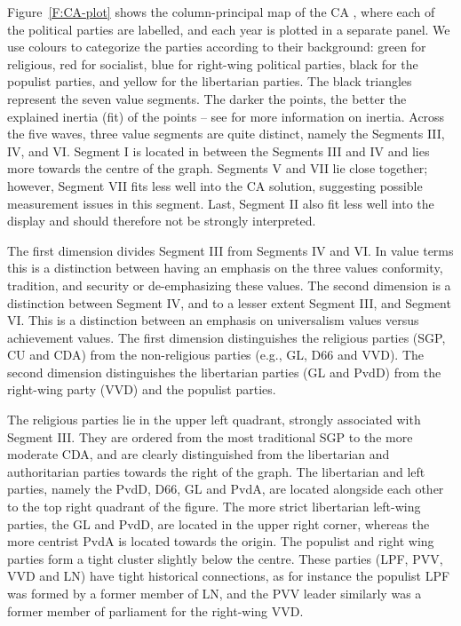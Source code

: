 \documentclass[12pt,letter]{article}\usepackage[]{graphicx}\usepackage[]{xcolor}
\begin{document}
Figure~\ref{F:CA-plot} shows the column-principal map of the CA \citep{greenacre2007}, where each of the political parties are labelled, and each year is plotted in a separate panel. We use colours to categorize the parties according to their background: green for religious, red for socialist, blue for right-wing political parties, black for the populist parties, and yellow for the libertarian parties. The black triangles represent the seven value segments. The darker the points, the better the explained inertia (fit) of the points -- see \citet{greenacre2007} for more information on inertia. Across the five waves, three value segments are quite distinct, namely the Segments III, IV, and VI. Segment I is located in between the Segments III and IV and lies more towards the centre of the graph. Segments V and VII lie close together; however, Segment VII fits less well into the CA solution, suggesting possible measurement issues in this segment. Last, Segment II also fit less well into the display and should therefore not be strongly interpreted.

The first dimension divides Segment III from Segments IV and VI. In value terms this is a distinction between having an emphasis on the three values conformity, tradition, and security or de-emphasizing these values. The second dimension is a distinction between Segment IV, and to a lesser extent Segment III, and Segment VI. This is a distinction between an emphasis on universalism values versus achievement values. The first dimension distinguishes the religious parties (SGP, CU and CDA) from the non-religious parties (e.g., GL, D66 and VVD). The second dimension distinguishes the libertarian parties (GL and PvdD) from the right-wing party (VVD) and the populist parties.

The religious parties lie in the upper left quadrant, strongly associated with Segment III. They are ordered from the most traditional SGP to the more moderate CDA, and are clearly distinguished from the libertarian and authoritarian parties towards the right of the graph. The libertarian and left parties, namely the PvdD, D66, GL and PvdA, are located alongside each other to the top right quadrant of the figure. The more strict libertarian left-wing parties, the GL and PvdD, are located in the upper right corner, whereas the more centrist PvdA is located towards the origin. The populist and right wing parties form a tight cluster slightly below the centre. These parties (LPF, PVV, VVD and LN) have tight historical connections, as for instance the populist LPF was formed by a former member of LN, and the PVV leader similarly was a former member of parliament for the right-wing VVD. 
\end{document}
